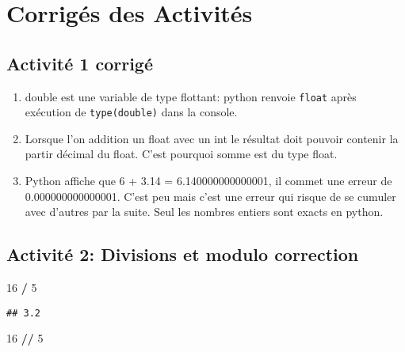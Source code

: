 \documentclass[
]{book}
\newenvironment{Shaded}{\begin{snugshade}}{\end{snugshade}}
\newcommand{\DecValTok}[1]{\textcolor[rgb]{0.00,0.00,0.81}{#1}}
\newcommand{\OperatorTok}[1]{\textcolor[rgb]{0.81,0.36,0.00}{\textbf{#1}}}
\providecommand{\tightlist}{%
  \setlength{\itemsep}{0pt}\setlength{\parskip}{0pt}}
\def\tightlist{}
\begin{document}
\hypertarget{corriguxe9s-des-activituxe9s}{%
\section{Corrigés des Activités}\label{corriguxe9s-des-activituxe9s}}

\hypertarget{activituxe9-1-corriguxe9}{%
\subsection{Activité 1 corrigé}\label{activituxe9-1-corriguxe9}}

\begin{enumerate}
\def\labelenumi{\arabic{enumi}.}
\tightlist
\item
  double est une variable de type flottant: python renvoie \texttt{float} après exécution de \texttt{type(double)} dans la console.
\item
  Lorsque l'on addition un float avec un int le résultat doit pouvoir contenir la partir décimal du float. C'est pourquoi somme est du type float.
\item
  Python affiche que 6 + 3.14 = 6.140000000000001, il commet une erreur de 0.000000000000001. C'est peu mais c'est une erreur qui risque de se cumuler avec d'autres par la suite. Seul les nombres entiers sont exacts en python.
\end{enumerate}

\newpage

\hypertarget{activituxe9-2-divisions-et-modulo-correction}{%
\subsection{Activité 2: Divisions et modulo correction}\label{activituxe9-2-divisions-et-modulo-correction}}

\begin{Shaded}
\begin{Highlighting}[]
\DecValTok{16} \OperatorTok{/} \DecValTok{5}
\end{Highlighting}
\end{Shaded}

\begin{verbatim}
## 3.2
\end{verbatim}

\begin{Shaded}
\begin{Highlighting}[]
\DecValTok{16} \OperatorTok{//} \DecValTok{5}
\end{Highlighting}
\end{Shaded}
\end{document}
